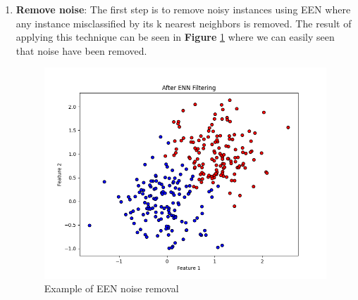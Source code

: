 \begin{enumerate}
    \item \textbf{Remove noise}: The first step is to remove noisy instances using EEN \cite{wilson1972asymptotic} where any instance misclassified by its k nearest neighbors is removed. The result of applying this technique can be seen in \textbf{Figure} \ref{fig:2dEEN} where we can easily seen that noise have been removed.
    \begin{figure}[ht]
        \centering
        \includegraphics[width=\textwidth]{figures/2dEEN} %
        \caption{Example of EEN noise removal}
        \label{fig:2dEEN}
    \end{figure}
\end{enumerate}

